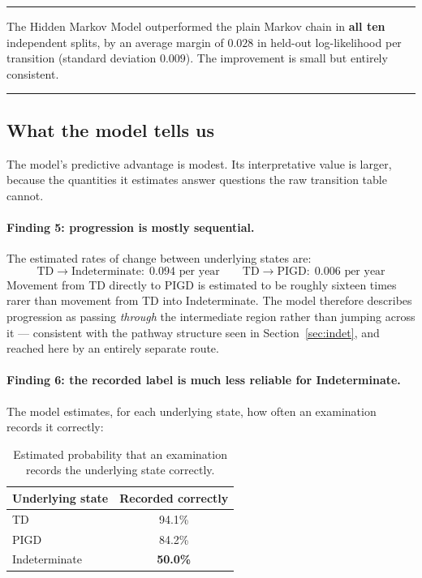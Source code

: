 \documentclass[11pt,a4paper]{article}
\newenvironment{keypoint}
  {\begin{center}\begin{minipage}{0.94\textwidth}%
   \vspace{4pt}\hrule\vspace{7pt}\small}
  {\vspace{7pt}\hrule\vspace{4pt}\end{minipage}\end{center}}
\begin{document}
\begin{keypoint}
The Hidden Markov Model outperformed the plain Markov chain in \textbf{all ten}
independent splits, by an average margin of $0.028$ in held-out log-likelihood
per transition (standard deviation $0.009$). The improvement is small but
entirely consistent.
\end{keypoint}

\subsection{What the model tells us}

The model's predictive advantage is modest. Its interpretative value is larger,
because the quantities it estimates answer questions the raw transition table
cannot.

\paragraph{Finding 5: progression is mostly sequential.}
The estimated rates of change between underlying states are:
\[
  \text{TD} \rightarrow \text{Indeterminate}: \; 0.094 \text{ per year}
  \qquad
  \text{TD} \rightarrow \text{PIGD}: \; 0.006 \text{ per year}
\]
Movement from TD directly to PIGD is estimated to be roughly sixteen times rarer
than movement from TD into Indeterminate. The model therefore describes
progression as passing \emph{through} the intermediate region rather than
jumping across it --- consistent with the pathway structure seen in
Section~\ref{sec:indet}, and reached here by an entirely separate route.

\paragraph{Finding 6: the recorded label is much less reliable for Indeterminate.}
The model estimates, for each underlying state, how often an examination records
it correctly:

\begin{table}[H]
\centering
\begin{tabular}{@{}lc@{}}
\toprule
\textbf{Underlying state} & \textbf{Recorded correctly} \\
\midrule
TD             & 94.1\% \\
PIGD           & 84.2\% \\
Indeterminate  & \textbf{50.0\%} \\
\bottomrule
\end{tabular}
\caption{Estimated probability that an examination records the underlying state
correctly.}
\end{table}
\end{document}
